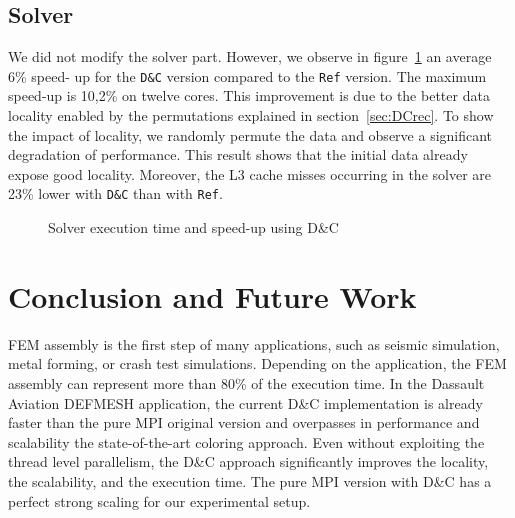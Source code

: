 \documentclass[10pt]{IOS-Book-Article}
\begin{document}
\subsection{Solver}

We did not modify the solver part. However, we observe in figure~\ref{fig:solCurves}  an average 6\% speed- up for the  {\tt D\&C} version compared to the {\tt Ref}  version. The maximum speed-up is 10,2\% on twelve cores. 
This improvement is due to the better data locality enabled by the permutations explained in section~\ref{sec:DCrec}.
To show the impact of locality, we randomly permute the data and observe a significant degradation of performance.
This result shows that the initial data already expose good locality.
Moreover, the L3 cache misses occurring in the solver are 23\% lower with {\tt D\&C} than with {\tt Ref}.

\begin{figure}[htp]
 \caption{Solver execution time and speed-up using D\&C}
 \label{fig:solCurves}
\end{figure}

\section{Conclusion and Future Work}
FEM assembly is the first step of many applications, such as seismic simulation, metal forming, or crash test simulations.
Depending on the application, the FEM assembly can represent more than 80\% of the execution time.
In the Dassault Aviation DEFMESH application, the current D\&C implementation is already faster than the pure MPI original version and overpasses in performance and scalability the state-of-the-art coloring approach.
Even without exploiting the thread level parallelism, the D\&C approach  significantly improves the locality, the scalability, and the execution time.
The pure MPI version with D\&C has a perfect strong scaling for our experimental setup.
\end{document}
